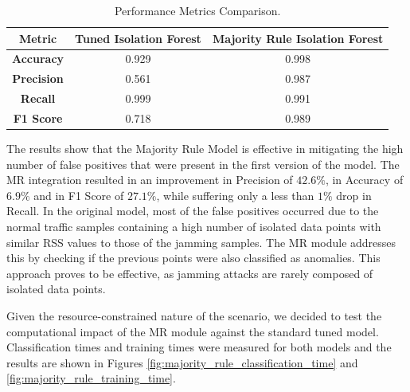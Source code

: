 \documentclass[futureinternet,article,submit,pdftex,moreauthors]{Definitions/mdpi}
\begin{document}
\begin{table}[H]
    \caption{Performance Metrics Comparison.}\label{tab:majority_rule_performanceMetrics}
    \begin{tabularx}{\textwidth}{CCC}
    \toprule
    \textbf{Metric} & \textbf{Tuned Isolation Forest} & \textbf{Majority Rule Isolation Forest} \\
    \midrule
    \textbf{Accuracy}  & 0.929 & 0.998 \\
    \textbf{Precision} & 0.561 & 0.987 \\
    \textbf{Recall}    & 0.999 & 0.991 \\
    \textbf{F1 Score}  & 0.718 & 0.989 \\
    \bottomrule
    \end{tabularx}
\end{table}

The results show that the Majority Rule Model is effective in mitigating the high number of false positives that were present in the first version of the model. 
The MR integration resulted in an improvement in Precision of $42.6\%$, in Accuracy of $6.9\%$ and in F1 Score of $27.1\%$, while suffering only a less than $1\%$ drop in Recall.
In the original model, most of the false positives occurred due to the normal traffic samples containing a high number of isolated data points with similar RSS values to those of the jamming samples. 
The MR module addresses this by checking if the previous points were also classified as anomalies. This approach proves to be effective, as jamming attacks are rarely composed of isolated data points.

Given the resource-constrained nature of the scenario, we decided to test the computational impact of the MR module against the standard tuned model. 
Classification times and training times were measured for both models and the results are shown in Figures \ref{fig:majority_rule_classification_time} and \ref{fig:majority_rule_training_time}.
\end{document}
